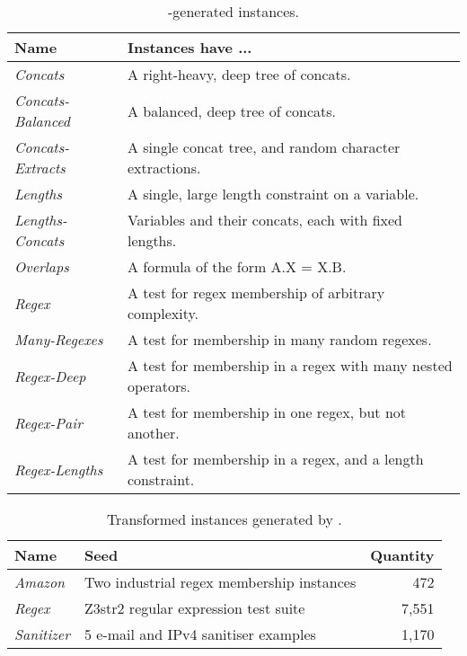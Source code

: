 \begin{table}[t]
    \centering
    \caption{\generator{}-generated instances.}
    \label{tbl:generated}
    \begin{tabular}{|l|l|}
        \hline
        \textbf{Name}             & \textbf{Instances have ...} \\ \hline
        \textit{Concats}          & A right-heavy, deep tree of concats. \\ \hline
        \textit{Concats-Balanced} & A balanced, deep tree of concats. \\ \hline
        \textit{Concats-Extracts} & A single concat tree, and random character extractions. \\ \hline
        \textit{Lengths}          & A single, large length constraint on a variable. \\ \hline
        \textit{Lengths-Concats}  & Variables and their concats, each with fixed lengths. \\ \hline
        \textit{Overlaps}         & A formula of the form A.X = X.B. \\ \hline
        \textit{Regex}            & A test for regex membership of arbitrary complexity. \\ \hline
        \textit{Many-Regexes}     & A test for membership in many random regexes. \\ \hline
        \textit{Regex-Deep}       & A test for membership in a regex with many nested operators. \\ \hline
        \textit{Regex-Pair}       & A test for membership in one regex, but not another. \\ \hline
        \textit{Regex-Lengths}    & A test for membership in a regex, and a length constraint. \\ \hline
    \end{tabular}
\end{table}

\begin{table}[t]
    \centering
    \caption{Transformed instances generated by \transformer{}.}
    \label{tbl:transformed}
    \begin{tabular}{|l|l|r|}
        \hline
        \textbf{Name}      & \textbf{Seed}                             & \textbf{Quantity} \\ \hline
        \textit{Amazon}    & Two industrial regex membership instances & 472 \\ \hline
        \textit{Regex}     & Z3str2 regular expression test suite      & 7,551 \\ \hline
        \textit{Sanitizer} & 5 e-mail and IPv4 sanitiser examples      & 1,170 \\ \hline
    \end{tabular}
\end{table}
